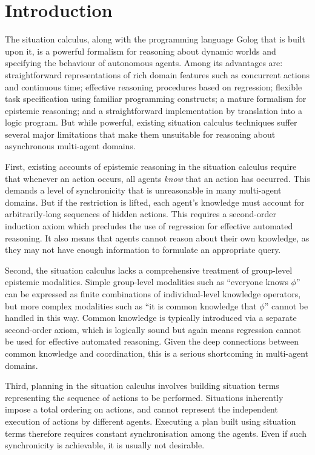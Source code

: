 

\chapter{Introduction}

The situation calculus, along with the programming language Golog
that is built upon it, is a powerful formalism for reasoning about
dynamic worlds and specifying the behaviour of autonomous agents.
Among its advantages are: straightforward representations of rich
domain features such as concurrent actions and continuous time; effective
reasoning procedures based on regression; flexible task specification
using familiar programming constructs; a mature formalism for epistemic
reasoning; and a straightforward implementation by translation into
a logic program. But while powerful, existing situation calculus techniques
suffer several major limitations that make them unsuitable for reasoning
about asynchronous multi-agent domains.

First, existing accounts of epistemic reasoning in the situation calculus
require that whenever an action occurs, all agents \emph{know} that
an action has occurred. This demands a level of synchronicity that
is unreasonable in many multi-agent domains. But if the restriction
is lifted, each agent's knowledge must account for arbitrarily-long
sequences of hidden actions. This requires a second-order induction
axiom which precludes the use of regression for effective automated
reasoning. It also means that agents cannot reason about their own
knowledge, as they may not have enough information to formulate an
appropriate query.

Second, the situation calculus lacks a comprehensive treatment of
group-level epistemic modalities. Simple group-level modalities such
as {}``everyone knows $\phi$'' can be expressed as finite combinations
of individual-level knowledge operators, but more complex modalities
such as {}``it is common knowledge that $\phi$'' cannot be handled
in this way. Common knowledge is typically introduced via a separate
second-order axiom, which is logically sound but again means regression
cannot be used for effective automated reasoning. Given the deep connections
between common knowledge and coordination, this is a serious shortcoming
in multi-agent domains.

Third, planning in the situation calculus involves building situation
terms representing the sequence of actions to be performed. Situations
inherently impose a total ordering on actions, and cannot represent
the independent execution of actions by different agents. Executing
a plan built using situation terms therefore requires constant synchronisation
among the agents. Even if such synchronicity is achievable, it is
usually not desirable.\\


